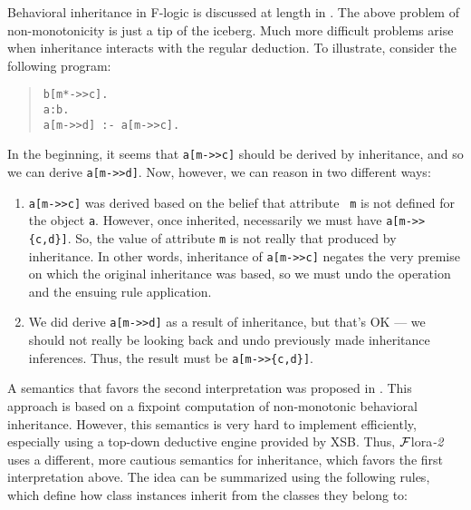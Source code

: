 \documentclass[11pt]{article}
\newcommand{\FLORA}{{\mbox{${\cal F}${\sc lora}\rm\emph{-2}}}\xspace}
\newcommand{\fl}{\mbox{F-logic}\xspace}
\begin{document}
Behavioral inheritance in \fl is discussed at length in \cite{KLW95}.
The above problem of non-monotonicity is just a tip of the iceberg. Much
more difficult problems arise when inheritance interacts with the regular
deduction. To illustrate, consider the following program:
\begin{quote}
\begin{verbatim}
b[m*->>c].
a:b.
a[m->>d] :- a[m->>c].
\end{verbatim}
\end{quote}
In the beginning, it seems that \verb|a[m->>c]| should be derived by
inheritance, and so we can derive \verb|a[m->>d]|. Now, however, we can
reason in two different ways:
\begin{enumerate}
\item \verb|a[m->>c]| was derived based on the belief that attribute {\tt
    m} is not defined for the object {\tt a}. However, once inherited,
  necessarily we must have \verb|a[m->>{c,d}]|. So, the value of
  attribute {\tt m} is not really that produced by inheritance. In other
  words, inheritance of \verb|a[m->>c]| negates the very premise on which
  the original inheritance was based, so we must undo the operation and the
  ensuing rule application.
\item We did derive \verb|a[m->>d]| as a result of inheritance, but
  that's OK --- we should not really be looking back and undo previously
  made inheritance inferences. Thus, the result must be \verb|a[m->>{c,d}]|.
\end{enumerate}
A semantics that favors the second interpretation was proposed in
\cite{KLW95}. This approach is based on a fixpoint computation of
non-monotonic behavioral inheritance.  However, this semantics is very hard
to implement efficiently, especially using a top-down deductive engine
provided by XSB. Thus, \FLORA uses a different, more cautious semantics for
inheritance, which favors the first interpretation above.  The idea can be
summarized using the following rules, which define how class instances
inherit from the classes they belong to:
\end{document}
